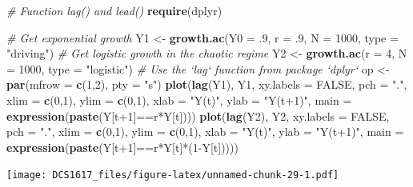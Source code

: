 \documentclass[]{book}
\newenvironment{Shaded}{\begin{snugshade}}{\end{snugshade}}
\newcommand{\KeywordTok}[1]{\textcolor[rgb]{0.13,0.29,0.53}{\textbf{{#1}}}}
\newcommand{\DataTypeTok}[1]{\textcolor[rgb]{0.13,0.29,0.53}{{#1}}}
\newcommand{\DecValTok}[1]{\textcolor[rgb]{0.00,0.00,0.81}{{#1}}}
\newcommand{\StringTok}[1]{\textcolor[rgb]{0.31,0.60,0.02}{{#1}}}
\newcommand{\CommentTok}[1]{\textcolor[rgb]{0.56,0.35,0.01}{\textit{{#1}}}}
\newcommand{\OtherTok}[1]{\textcolor[rgb]{0.56,0.35,0.01}{{#1}}}
\newcommand{\NormalTok}[1]{{#1}}
\begin{document}
\begin{Shaded}
\begin{Highlighting}[]
\CommentTok{# Function lag() and lead()}
\KeywordTok{require}\NormalTok{(dplyr)}

\CommentTok{# Get exponential growth}
\NormalTok{Y1 <-}\StringTok{ }\KeywordTok{growth.ac}\NormalTok{(}\DataTypeTok{Y0 =} \NormalTok{.}\DecValTok{9}\NormalTok{, }\DataTypeTok{r =} \NormalTok{.}\DecValTok{9}\NormalTok{, }\DataTypeTok{N =} \DecValTok{1000}\NormalTok{, }\DataTypeTok{type =} \StringTok{"driving"}\NormalTok{)}
\CommentTok{# Get logistic growth in the chaotic regime}
\NormalTok{Y2 <-}\StringTok{ }\KeywordTok{growth.ac}\NormalTok{(}\DataTypeTok{r =} \DecValTok{4}\NormalTok{, }\DataTypeTok{N =} \DecValTok{1000}\NormalTok{, }\DataTypeTok{type =} \StringTok{"logistic"}\NormalTok{)}
\CommentTok{# Use the `lag` function from package `dplyr`}
\NormalTok{op <-}\StringTok{ }\KeywordTok{par}\NormalTok{(}\DataTypeTok{mfrow =} \KeywordTok{c}\NormalTok{(}\DecValTok{1}\NormalTok{,}\DecValTok{2}\NormalTok{), }\DataTypeTok{pty =} \StringTok{"s"}\NormalTok{)}
\KeywordTok{plot}\NormalTok{(}\KeywordTok{lag}\NormalTok{(Y1), Y1, }\DataTypeTok{xy.labels =} \OtherTok{FALSE}\NormalTok{, }\DataTypeTok{pch =} \StringTok{"."}\NormalTok{, }\DataTypeTok{xlim =} \KeywordTok{c}\NormalTok{(}\DecValTok{0}\NormalTok{,}\DecValTok{1}\NormalTok{), }\DataTypeTok{ylim =} \KeywordTok{c}\NormalTok{(}\DecValTok{0}\NormalTok{,}\DecValTok{1}\NormalTok{), }\DataTypeTok{xlab =} \StringTok{"Y(t)"}\NormalTok{, }\DataTypeTok{ylab =} \StringTok{"Y(t+1)"}\NormalTok{,}
     \DataTypeTok{main =} \KeywordTok{expression}\NormalTok{(}\KeywordTok{paste}\NormalTok{(Y[t}\DecValTok{+1}\NormalTok{]==r*Y[t])))}
\KeywordTok{plot}\NormalTok{(}\KeywordTok{lag}\NormalTok{(Y2), Y2, }\DataTypeTok{xy.labels =} \OtherTok{FALSE}\NormalTok{, }\DataTypeTok{pch =} \StringTok{"."}\NormalTok{, }\DataTypeTok{xlim =} \KeywordTok{c}\NormalTok{(}\DecValTok{0}\NormalTok{,}\DecValTok{1}\NormalTok{), }\DataTypeTok{ylim =} \KeywordTok{c}\NormalTok{(}\DecValTok{0}\NormalTok{,}\DecValTok{1}\NormalTok{), }\DataTypeTok{xlab =} \StringTok{"Y(t)"}\NormalTok{, }\DataTypeTok{ylab =} \StringTok{"Y(t+1)"}\NormalTok{,}
     \DataTypeTok{main =} \KeywordTok{expression}\NormalTok{(}\KeywordTok{paste}\NormalTok{(Y[t}\DecValTok{+1}\NormalTok{]==r*Y[t]*(}\DecValTok{1}\NormalTok{-Y[t]))))}
\end{Highlighting}
\end{Shaded}

\texttt{[image: DCS1617\_files/figure-latex/unnamed-chunk-29-1.pdf]}
\end{document}
